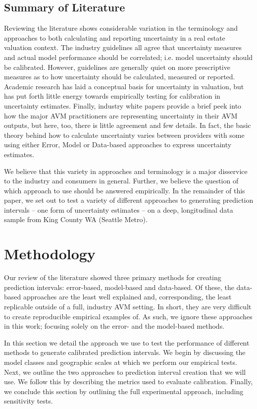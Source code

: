 \documentclass[colTwo]{anon}
\theoremstyle{definition}
\begin{document}
\subsection{Summary of Literature}

Reviewing the literature shows considerable variation in the terminology and approaches to both calculating and reporting uncertainty in a real estate valuation context.  The industry guidelines all agree that uncertainty measures and actual model performance should be correlated; i.e. model uncertainty should be calibrated.  However, guidelines are generally quiet on more prescriptive measures as to how uncertainty should be calculated, measured or reported.  Academic research has laid a conceptual basis for uncertainty in valuation, but has put forth little energy towards empirically testing for calibration in uncertainty estimates.  Finally, industry white papers provide a brief peek into how the major AVM practitioners are representing uncertainty in their AVM outputs, but here, too, there is little agreement and few details. In fact, the basic theory behind how to calculate uncertainty varies between providers with some using either Error, Model or Data-based approaches to express uncertainty estimates.   

We believe that this variety in approaches and terminology is a major disservice to the industry and consumers in general.  Further, we believe the question of which approach to use should be answered empirically.  In the remainder of this paper, we set out to test a variety of different approaches to generating prediction intervals -- one form of uncertainty estimates -- on a deep, longitudinal data sample from King County WA (Seattle Metro).
 
\section{Methodology}

Our review of the literature showed three primary methods for creating prediction intervals: error-based, model-based and data-based.  Of these, the data-based approaches are the least well explained and, corresponding, the least replicable outside of a full, industry AVM setting. In short, they are very difficult to create reproducible empirical examples of.  As such, we ignore these approaches in this work; focusing solely on the error- and the model-based methods.

In this section we detail the approach we use to test the performance of different methods to generate calibrated prediction intervals. We begin by discussing the model classes and geographic scales at which we perform our empirical tests.  Next, we outline the two approaches to prediction interval creation that we will use.  We follow this by describing the metrics used to evaluate calibration.  Finally, we conclude this section by outlining the full experimental approach, including sensitivity tests. 
\end{document}
